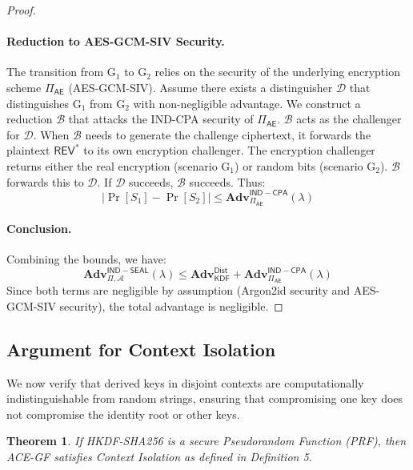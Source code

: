 \documentclass[12pt,a4paper]{article}
\newtheorem{theorem}{Theorem}[section]
\begin{document}
\begin{proof}
   \paragraph{Reduction to AES-GCM-SIV Security.}
   The transition from $\mathrm{G}_1$ to $\mathrm{G}_2$ relies on the security of the underlying encryption scheme $\Pi_{\mathsf{AE}}$ (AES-GCM-SIV).
   Assume there exists a distinguisher $\mathcal{D}$ that distinguishes $\mathrm{G}_1$ from $\mathrm{G}_2$ with non-negligible advantage. We construct a reduction $\mathcal{B}$ that attacks the IND-CPA security of $\Pi_{\mathsf{AE}}$.
   $\mathcal{B}$ acts as the challenger for $\mathcal{D}$. When $\mathcal{B}$ needs to generate the challenge ciphertext, it forwards the plaintext $\mathsf{REV}^*$ to its own encryption challenger. The encryption challenger returns either the real encryption (scenario $\mathrm{G}_1$) or random bits (scenario $\mathrm{G}_2$). $\mathcal{B}$ forwards this to $\mathcal{D}$. If $\mathcal{D}$ succeeds, $\mathcal{B}$ succeeds.
   Thus:
   \[
  |\Pr[S_1] - \Pr[S_2]| \le \mathbf{Adv}_{\Pi_{\mathsf{AE}}}^{\mathsf{IND-CPA}}(\lambda)
   \]

   \paragraph{Conclusion.}
   Combining the bounds, we have:
   \[
  \mathbf{Adv}_{\Pi, \mathcal{A}}^{\mathsf{IND-SEAL}}(\lambda) \le \mathbf{Adv}_{\mathsf{KDF}}^{\mathsf{Dist}} + \mathbf{Adv}_{\Pi_{\mathsf{AE}}}^{\mathsf{IND-CPA}}(\lambda)
   \]
   Since both terms are negligible by assumption (Argon2id security and AES-GCM-SIV security), the total advantage is negligible.
  \end{proof}

  \subsection{Argument for Context Isolation}

  We now verify that derived keys in disjoint contexts are computationally indistinguishable from random strings, ensuring that compromising one key does not compromise the identity root or other keys.

  \begin{theorem}
   If HKDF-SHA256 is a secure Pseudorandom Function (PRF), then ACE-GF satisfies Context Isolation as defined in Definition 5.
  \end{theorem}
\end{document}
